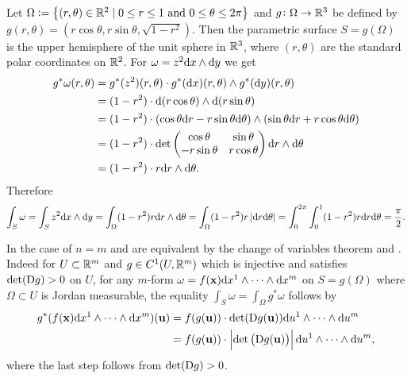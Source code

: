 \documentclass[11pt,a4paper]{article}
\begin{document}
\begin{example}
  \label{exmp:positive-orientation}
  Let $\Omega := \left\{(r,\theta) \in \mathbb{R}^2 \mid 0 \le r \le 1 \text{ and } 0 \le \theta \le 2\pi\right\}$
  and $g \colon \Omega \to \mathbb{R}^3$
  be defined by
  $g(r,\theta) = (r\cos\theta, r\sin\theta,\sqrt{1-r^2})$.
  Then the parametric surface $S = g(\Omega)$ is the upper
  hemisphere of the unit sphere in $\mathbb{R}^3$,
  where $(r,\theta)$ are the standard polar coordinates on $\mathbb{R}^2$.
  For $\omega = z^2 \dx \wedge \dy$ we get
  \begin{align*}
    g^*\omega(r,\theta) &=
    g^*(z^2)(r,\theta) \cdot g^*(\dx)(r,\theta) \wedge g^*(\dy)(r,\theta) \\ &=
    (1 - r^2) \cdot \dif(r\cos\theta) \wedge \dif(r\sin\theta) \\ &=
    (1 - r^2) \cdot (\cos\theta \dr - r\sin\theta \dtheta) \wedge
    (\sin\theta \dr + r\cos\theta \dtheta) \\ &=
    (1 - r^2) \cdot \det
    \begin{pmatrix}
      \cos\theta & \sin\theta \\
      -r\sin\theta & r\cos\theta
    \end{pmatrix} \dr \wedge \dtheta \\ &=
    (1 - r^2) \cdot r \dr \wedge \dtheta.
  \end{align*}
  Therefore
  \[
    \int_{S} \omega =
    \int_{S} z^2 \dx \wedge \dy =
    \int_{\Omega} (1 - r^2) r \dr \wedge \dtheta =
    \int_{\Omega} (1 - r^2) r \abs{\dr \dtheta} =
    \int_{0}^{2\pi} \int_{0}^{1} (1 - r^2) r \dr \dtheta =
    \frac{\pi}{2}.
  \]
\end{example}

\begin{remark}
  In the case of $n = m$
   and 
  are equivalent by the change of variables theorem
  and .
  Indeed for $U \subset \mathbb{R}^m$ and $g \in C^1(U,\mathbb{R}^m)$ which is
  injective and satisfies $\det(\mathrm{D} g) > 0$ on $U$,
  for any $m$-form $\omega = f(\vec x)\dx^1 \wedge \cdots \wedge \dx^m$
  on $S = g(\Omega)$ where $\Omega \subset U$ is Jordan measurable,
  the equality $\int_{S} \omega = \int_{\Omega} g^*\omega$ follows
  by 
  \begin{align*}
    g^*(f(\vec x)\dx^1 \wedge \cdots \wedge \dx^m)(\vec u) &=
    f(g(\vec u)) \cdot \det(\Dif g(\vec u))
      \du^1 \wedge \cdots \wedge \du^m \\ &=
    f(g(\vec u)) \cdot \abs{\det\del{\Dif g(\vec u)}}
      \du^1 \wedge \cdots \wedge \du^m,
  \end{align*}
  where the last step follows from $\det(\mathrm{D} g) > 0$.
\end{remark}
\end{document}

